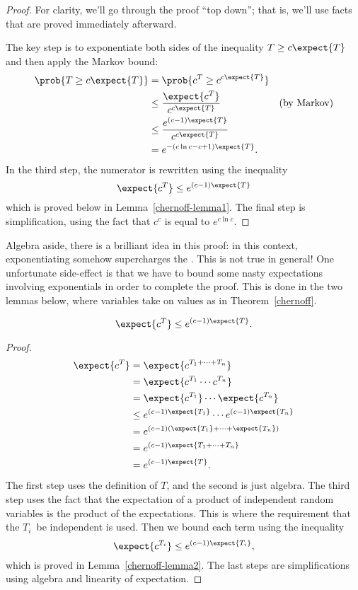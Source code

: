 \begin{proof} 

For clarity, we'll go through the proof ``top down''; that is, we'll
use facts that are proved immediately afterward.

The key step is to exponentiate both sides of the inequality $T \ge c
\expect{T}$ and then apply the Markov bound:
\begin{align*}
\prob{T \geq c \expect{T}} & = \prob{c^T \geq c^{c \expect{T}}} \\
  & \leq \frac{\expect{c^T}}{c^{c \expect{T}}} & \text{(by Markov)}\\
  & \leq \frac{e^{(c-1) \expect{T}}}{c^{c \expect{T}}} \\
  & = e^{- (c \ln c - c + 1) \expect{T}}.
\end{align*}
In the third step, the numerator is rewritten using the inequality
\[
\expect{c^T} \leq e^{(c-1) \expect{T}}
\]
which is proved below in Lemma~\ref{chernoff-lemma1}.  The final step
is simplification, using the fact that $c^c$ is equal to $e ^{c \ln
  c}$.
\end{proof}

Algebra aside, there is a brilliant idea in this proof: in this
context, exponentiating somehow supercharges the .
This is not true in general!  One unfortunate side-effect is that we
have to bound some nasty expectations involving exponentials in order
to complete the proof.  This is done in the two lemmas below, where
variables take on values as in Theorem~\ref{chernoff}.

\begin{lemma}
\label{chernoff-lemma1}
\[
    \expect{c^T} \leq e^{(c-1) \expect{T}}.
\]
\end{lemma}

\begin{proof}
\begin{align*}
    \expect{c^T} & = \expect{c^{T_1 + \cdots + T_n}} \\
            & = \expect{c^{T_1} \cdots c^{T_n}} \\
            & = \expect{c^{T_1}}  \cdots \expect{c^{T_n}} \\
            & \leq e^{(c-1) \expect{T_1}} \cdots  e^{(c-1) \expect{T_n}} \\
            & = e^{(c-1) (\expect{T_1} + \cdots + \expect{T_n})} \\
            & = e^{(c-1) \expect{T_1 + \cdots + T_n}} \\
            & = e^{(c-1) \expect{T}}.
\end{align*}
The first step uses the definition of $T$, and the second is just
algebra.  The third step uses the fact that the expectation of a
product of independent random variables is the product of the
expectations.  This is where the requirement that the $T_i$~be
independent is used.  Then we bound each term using the inequality
\[
    \expect{c^{T_i}} \leq e^{(c - 1) \expect{T_i}},
\]
which is proved in Lemma~\ref{chernoff-lemma2}.  The last steps are
simplifications using algebra and linearity of expectation.
\end{proof}

